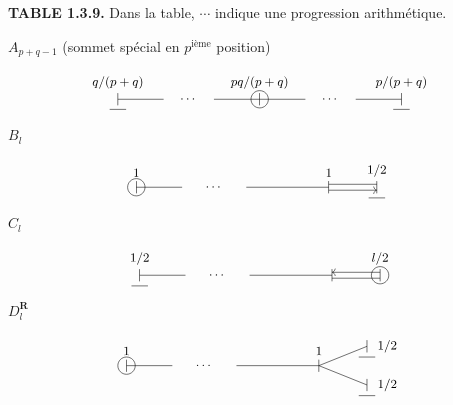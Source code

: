 \documentclass[10pt,a4paper]{article}
\begin{document}
\textbf{TABLE 1.3.9.} Dans la table, \(\cdots\) indique une progression arithmétique.

\(A_{p+q-1}\) (sommet spécial en \(p^{\text{ième}}\) position)

\[
\begin{tikzpicture}[x=1.15cm,y=0.75cm,baseline=(current bounding box.center),every node/.style={font=\small}]
\draw (0,0)--(1,0); \node at (1.55,0) {$\cdots$}; \draw (2.1,0)--(3.1,0); \node[circle,draw,inner sep=1.2pt] at (3.1,0) {$\vert$}; \draw (3.1,0)--(4.1,0); \node at (4.65,0) {$\cdots$}; \draw (5.2,0)--(6.2,0);
\node at (0,0) {$\vert$}; \node at (6.2,0) {$\vert$};
\node[above,yshift=4pt] at (0,0) {$q/(p+q)$}; \node[above,yshift=4pt] at (3.1,0) {$pq/(p+q)$}; \node[above,yshift=4pt] at (6.2,0) {$p/(p+q)$};
\draw (-0.18,-0.34)--(0.18,-0.34); \draw (6.02,-0.34)--(6.38,-0.34);
\end{tikzpicture}
\]

\(B_l\)

\[
\begin{tikzpicture}[x=1.15cm,y=0.75cm,baseline=(current bounding box.center),every node/.style={font=\small}]
\node[circle,draw,inner sep=1.2pt] at (0,0) {$\vert$}; \draw (0,0)--(1,0); \node at (1.7,0) {$\cdots$}; \draw (2.4,0)--(4.2,0); \node at (4.2,0) {$\vert$}; \node at (5.25,0) {$\vert$};
\draw (4.2,0.10)--(5.25,0.10); \draw[->] (4.2,-0.10)--(5.25,-0.10);
\node[above,yshift=4pt] at (0,0) {$1$}; \node[above,yshift=4pt] at (4.2,0) {$1$}; \node[above,yshift=4pt] at (5.25,0) {$1/2$};
\draw (5.07,-0.36)--(5.43,-0.36);
\end{tikzpicture}
\]

\(C_l\)

\[
\begin{tikzpicture}[x=1.15cm,y=0.75cm,baseline=(current bounding box.center),every node/.style={font=\small}]
\node at (0,0) {$\vert$}; \draw (0,0)--(1,0); \node at (1.7,0) {$\cdots$}; \draw (2.4,0)--(4.2,0); \node at (4.2,0) {$\vert$}; \node[circle,draw,inner sep=1.2pt] at (5.25,0) {$\vert$};
\draw[<-] (4.2,0.10)--(5.25,0.10); \draw (4.2,-0.10)--(5.25,-0.10);
\node[above,yshift=4pt] at (0,0) {$1/2$}; \node[above,yshift=4pt] at (5.25,0) {$l/2$};
\draw (-0.18,-0.36)--(0.18,-0.36);
\end{tikzpicture}
\]

\(D_l^{\mathbf R}\)

\[
\begin{tikzpicture}[x=1.15cm,y=0.75cm,baseline=(current bounding box.center),every node/.style={font=\small}]
\node[circle,draw,inner sep=1.2pt] at (0,0) {$\vert$}; \draw (0,0)--(1,0); \node at (1.7,0) {$\cdots$}; \draw (2.4,0)--(4.2,0); \node at (4.2,0) {$\vert$};
\draw (4.2,0)--(5.25,0.65); \draw (4.2,0)--(5.25,-0.65); \node at (5.25,0.65) {$\vert$}; \node at (5.25,-0.65) {$\vert$};
\node[above,yshift=4pt] at (0,0) {$1$}; \node[above,yshift=4pt] at (4.2,0) {$1$}; \node[right,xshift=4pt] at (5.25,0.65) {$1/2$}; \node[right,xshift=4pt] at (5.25,-0.65) {$1/2$};
\draw (5.07,0.29)--(5.43,0.29); \draw (5.07,-1.01)--(5.43,-1.01);
\end{tikzpicture}
\]
\end{document}
